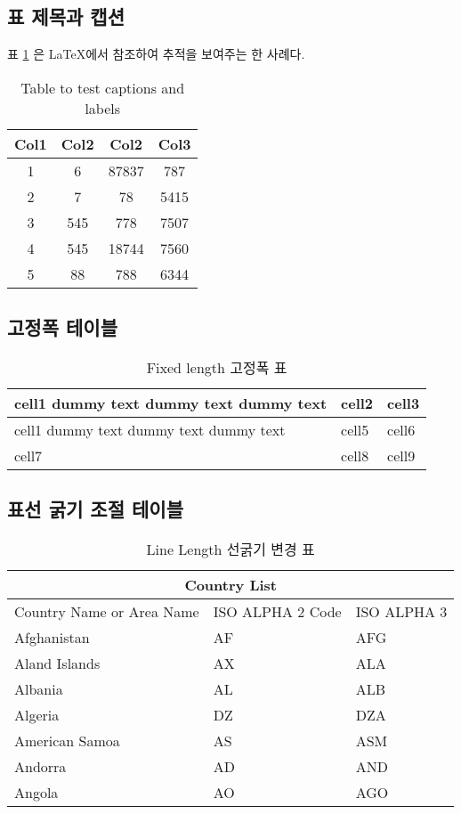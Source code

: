 \subsection{표 제목과 캡션}

표 \ref{table:1} 은 \LaTeX 에서 참조하여 추적을 보여주는 한 사례다.

\begin{table}[h!]
	\centering
	\begin{tabular}{||c c c c||} 
		\hline
		Col1 & Col2 & Col2 & Col3 \\ [0.5ex] 
		\hline\hline
		1 & 6 & 87837 & 787 \\ 
		2 & 7 & 78 & 5415 \\
		3 & 545 & 778 & 7507 \\
		4 & 545 & 18744 & 7560 \\
		5 & 88 & 788 & 6344 \\ [1ex] 
		\hline
	\end{tabular}
	\caption{Table to test captions and labels}
	\label{table:1}
\end{table}

\subsection{고정폭 테이블}

\blindtext

\begin{table}[h!]
	\centering
	\begin{tabular}{ | m{5em} | m{1cm}| m{1cm} | } 
		\hline
		cell1 dummy text dummy text dummy text& cell2 & cell3 \\ 
		\hline
		cell1 dummy text dummy text dummy text & cell5 & cell6 \\ 
		\hline
		cell7 & cell8 & cell9 \\ 
		\hline
	\end{tabular}
	\caption{Fixed length 고정폭 표}
    \label{table:2}
\end{table}

\subsection{표선 굵기 조절 테이블}

\begin{table}[h!]
	\centering
	\begin{tabular}{ |p{3cm}|p{3cm}|p{3cm}|  }
		\hline
		\multicolumn{3}{|c|}{Country List} \\
		\hline
		Country Name     or Area Name& ISO ALPHA 2 Code &ISO ALPHA 3 \\
		\hline
		Afghanistan & AF &AFG \\
		Aland Islands & AX   & ALA \\
		Albania &AL & ALB \\
		Algeria    &DZ & DZA \\
		American Samoa & AS & ASM \\
		Andorra & AD & AND   \\
		Angola & AO & AGO \\
		\hline
	\end{tabular}
	\caption{Line Length 선굵기 변경 표}
	\label{table:3}
\end{table}

